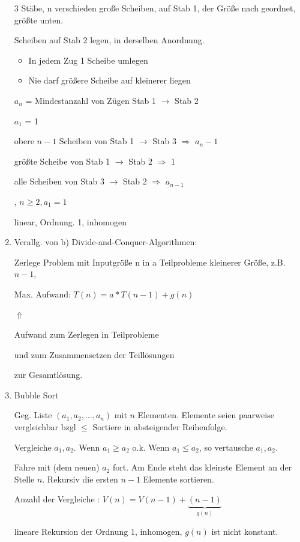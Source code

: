 \begin{enumerate}
	 3 Stäbe, n verschieden große Scheiben, auf Stab 1, der Größe nach geordnet, größte unten.
	 
	 Scheiben auf Stab 2 legen, in derselben Anordnung.
	 \begin{itemize}
	 	\item In jedem Zug 1 Scheibe umlegen
	 	\item Nie darf größere Scheibe auf kleinerer liegen
	 \end{itemize}
	 $a_n$ = Mindestanzahl von Zügen Stab 1 $\rightarrow$ Stab 2
	 
	 $a_1$ = 1
	 
	 obere $n-1$ Scheiben von Stab 1 $\rightarrow$ Stab 3 $\Rightarrow$ $a_n-1$ 
	 
	 größte Scheibe von Stab 1 $\rightarrow$ Stab 2 $\Rightarrow$ 1 
	 
	 alle Scheiben von Stab 3 $\rightarrow$ Stab 2 $\Rightarrow$ $a_{n-1}$ 
	 
	 , $n\geq2, a_1 = 1$ 
	 
	 linear, Ordnung. 1, inhomogen
	 
	 \item Verallg. von b) Divide-and-Conquer-Algorithmen:
	 
	 Zerlege Problem mit Inputgröße n in a Teilprobleme kleinerer Größe, z.B. $n - 1$,
	 
	 Max. Aufwand: $T(n) = a*T(n-1)+g(n)$
	 
	 
	 \qquad   \qquad \qquad \qquad  \qquad  \qquad \qquad \qquad$\Uparrow$

	 \qquad   \qquad \qquad  \qquad  \qquad \qquad \qquad Aufwand zum Zerlegen in Teilprobleme
	 
	 \qquad   \qquad \qquad  \qquad  \qquad \qquad \qquad und zum Zusammensetzen der Teillösungen
	 
	 \qquad   \qquad \qquad  \qquad  \qquad \qquad \qquad zur Gesamtlösung.
	 
	 
	 \item Bubble Sort
	 
	 Geg. Liste $(a_1, a_2, \dots, a_n)$ mit $n$ Elementen. Elemente seien paarweise vergleichbar bzgl $\leq$
	 Sortiere in absteigender Reihenfolge.
	 
	 Vergleiche $a_1, a_2$. Wenn $a_1 \geq a_2$ o.k. Wenn $a_1 \leq a_2$, so vertausche $a_1, a_2$.
	 
	 Fahre mit (dem neuen) $a_2$ fort. 
	 Am Ende steht das kleinste Element an der Stelle $n$. 
	 Rekursiv die ersten $n-1$ Elemente sortieren.
	 
	 Anzahl der Vergleiche : $V(n) = V(n-1) + \underbrace{(n-1)}_{g(n)}$
	 
	 lineare Rekursion der Ordnung 1, inhomogen, $g(n)$ ist nicht konstant.  
	 
	 
\end{enumerate}